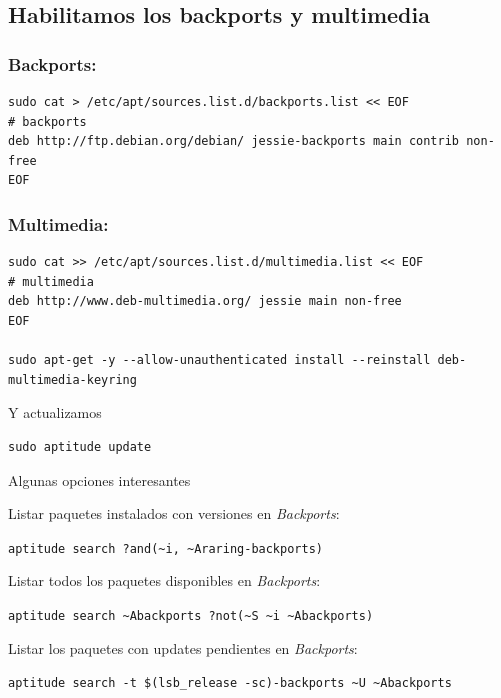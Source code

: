 \documentclass[12pt,spanish,]{scrartcl}
\begin{document}
\hypertarget{habilitamos-los-backports-y-multimedia}{%
\subsection{Habilitamos los backports y
multimedia}\label{habilitamos-los-backports-y-multimedia}}

\hypertarget{backports}{%
\subsubsection{Backports:}\label{backports}}

\begin{verbatim}
sudo cat > /etc/apt/sources.list.d/backports.list << EOF
# backports
deb http://ftp.debian.org/debian/ jessie-backports main contrib non-free
EOF
\end{verbatim}

\hypertarget{multimedia}{%
\subsubsection{Multimedia:}\label{multimedia}}

\begin{verbatim}
sudo cat >> /etc/apt/sources.list.d/multimedia.list << EOF
# multimedia
deb http://www.deb-multimedia.org/ jessie main non-free
EOF

sudo apt-get -y --allow-unauthenticated install --reinstall deb-multimedia-keyring
\end{verbatim}

Y actualizamos

\begin{verbatim}
sudo aptitude update
\end{verbatim}

Algunas opciones interesantes

Listar paquetes instalados con versiones en \emph{Backports}:

\texttt{aptitude\ search\ \textquotesingle{}?and(\textasciitilde{}i,\ \textasciitilde{}Araring-backports)\textquotesingle{}}

Listar todos los paquetes disponibles en \emph{Backports}:

\texttt{aptitude\ search\ \textquotesingle{}\textasciitilde{}Abackports\ ?not(\textasciitilde{}S\ \textasciitilde{}i\ \textasciitilde{}Abackports)\textquotesingle{}}

Listar los paquetes con updates pendientes en \emph{Backports}:

\texttt{aptitude\ search\ -t\ \$(lsb\_release\ -sc)-backports\ \textquotesingle{}\textasciitilde{}U\ \textasciitilde{}Abackports\textquotesingle{}}
\end{document}
